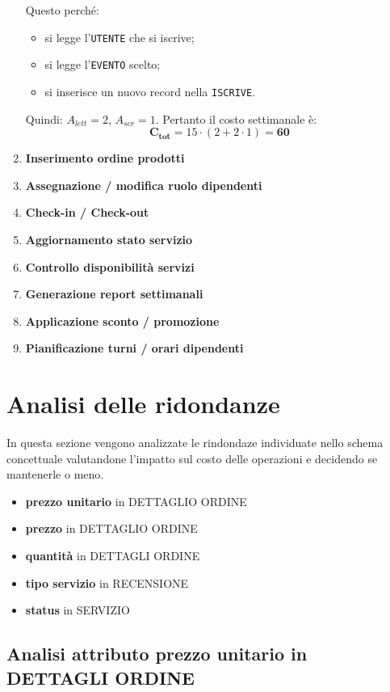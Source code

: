 \documentclass[a4paper,12pt]{report}
\begin{document}
\begin{enumerate}
    Questo perché:
    \begin{itemize}
        \item si legge l’\texttt{UTENTE} che si iscrive;
        \item si legge l’\texttt{EVENTO} scelto;
        \item si inserisce un nuovo record nella \texttt{ISCRIVE}.
    \end{itemize}

    Quindi: $A_{lett}=2$, $A_{scr}=1$.  
	Pertanto il costo settimanale è:
    $$\mathbf{C_{tot}} = 15 \cdot (2 + 2 \cdot 1) = \mathbf{60}$$
	\item \textbf{Inserimento ordine prodotti} \label{op11}
	\item \textbf{Assegnazione / modifica ruolo dipendenti} \label{op12}
	\item \textbf{Check-in / Check-out} \label{op13}
	\item \textbf{Aggiornamento stato servizio} \label{op14}
	\item \textbf{Controllo disponibilità servizi} \label{op15}
	\item \textbf{Generazione report settimanali} \label{op16}
	\item \textbf{Applicazione sconto / promozione} \label{op17}
	\item \textbf{Pianificazione turni / orari dipendenti} \label{op18}
\end{enumerate}

\section{Analisi delle ridondanze}
In questa sezione vengono analizzate le rindondaze individuate nello schema concettuale valutandone l'impatto sul
costo delle operazioni e decidendo se mantenerle o meno.

\begin{itemize}
	\item \textbf{prezzo unitario} in DETTAGLIO ORDINE
	\item \textbf{prezzo} in DETTAGLIO ORDINE
	\item \textbf{quantità} in DETTAGLI ORDINE
	\item \textbf{tipo servizio} in RECENSIONE
	\item \textbf{status} in SERVIZIO
\end{itemize}

\subsection{Analisi attributo prezzo unitario in DETTAGLI ORDINE}
\end{document}
